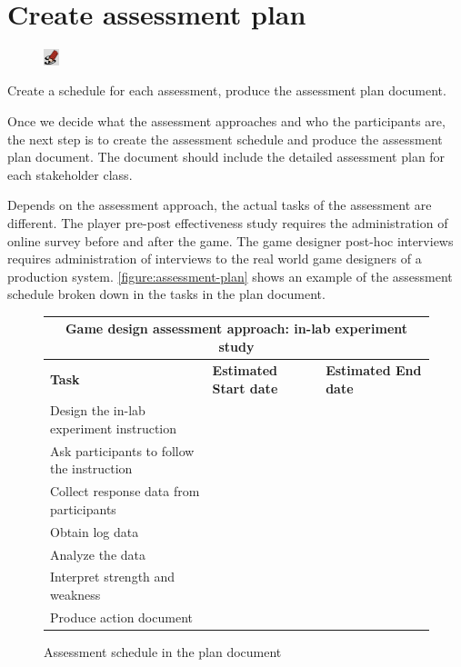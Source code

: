 \documentclass[11pt,oneside]{book}
\newcommand\tabhead[1]{\small\textbf{#1}}
\begin{document}
\section{Create assessment plan}
\begin{shadebox}
\begin{figure}
\vspace{-15pt}\hspace{-10pt}
    \includegraphics[width=0.04\textwidth]{note-icon}
\end{figure}
Create a schedule for each assessment, produce the assessment plan document.
\end{shadebox}

Once we decide what the assessment approaches and who the participants are, the next step is to create the assessment 
schedule and produce the assessment plan document. The document should include the detailed assessment plan for 
each stakeholder class. 

Depends on the assessment approach, the actual tasks of the assessment are different. The player pre-post 
effectiveness study requires the administration of online survey before and after the game. The game designer 
post-hoc interviews requires administration of interviews to the real world game designers of a production 
system. \autoref{figure:assessment-plan} shows an example of the assessment schedule broken down in the tasks 
in the plan document.

\begin{figure}[ht!]
  \centering
  \begin{tabular}{|p{}|p{}|p{}|}
    \hline
    \multicolumn{3}{|c|}{\tabhead{Game design assessment approach: in-lab experiment study}} \\
    \hline
    \tabhead{Task} &
    \tabhead{Estimated Start date} &
    \tabhead{Estimated End date} \\
    \hline
    Design the in-lab experiment instruction & & \\
    \hline
    Ask participants to follow the instruction & & \\
    \hline
    Collect response data from participants & & \\
    \hline
    Obtain log data & & \\
    \hline
    Analyze the data & & \\
    \hline
    Interpret strength and weakness & & \\
    \hline
    Produce action document & & \\
    \hline
  \end{tabular}
  \caption{Assessment schedule in the plan document}
  \label{figure:assessment-plan}
\end{figure}
\end{document}
